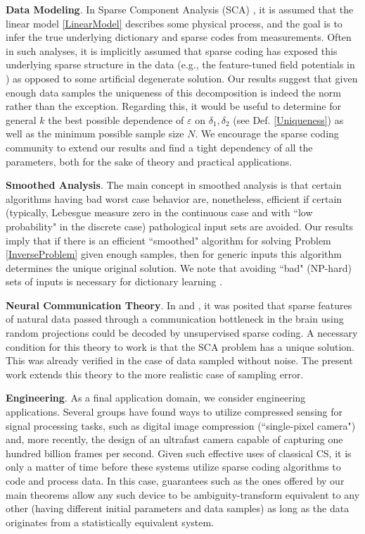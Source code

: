 \documentclass[journal, twocolumn]{IEEEtran}
\begin{document}
\textbf{Data Modeling}.  
In Sparse Component Analysis (SCA) \cite{Georgiev05}, it is assumed that the linear model \eqref{LinearModel} describes some physical process, and the goal is to infer the true underlying dictionary and sparse codes from measurements. Often in such analyses, it is implicitly assumed that sparse coding has exposed this underlying sparse structure in the data (e.g., the feature-tuned field potentials in \cite{Agarwal14}) as opposed to some artificial degenerate solution. Our results suggest that given enough data samples the uniqueness of this decomposition is indeed the norm rather than the exception. Regarding this, it would be useful to determine for general $k$ the best possible dependence of $\varepsilon$ on $\delta_1, \delta_2$ (see Def. \ref{Uniqueness}) as well as the minimum possible sample size $N$. We encourage the sparse coding community to extend our results and find a tight dependency of all the parameters, both for the sake of theory and practical applications.

\textbf{Smoothed Analysis}.
The main concept in smoothed analysis \cite{Spielman04} is that certain algorithms having bad worst case behavior are, nonetheless, efficient if certain (typically, Lebesgue measure zero in the continuous case and with ``low probability" in the discrete case) pathological input sets are avoided. Our results imply that if there is an efficient ``smoothed" algorithm for solving Problem \ref{InverseProblem} given enough samples, then for generic inputs this algorithm determines the unique original solution. We note that avoiding ``bad" (NP-hard) sets of inputs is necessary for dictionary learning \cite{Razaviyayn15, Tillmann15}.

\textbf{Neural Communication Theory}.
In \cite{Coulter10} and \cite{Isely10}, it was posited that sparse features of natural data passed through a communication bottleneck in the brain using random projections could be decoded by unsupervised sparse coding.  A necessary condition for this theory to work is that the SCA problem has a unique solution.  This was already verified in the case of data sampled without noise.  The present work extends this theory to the more realistic case of sampling error.

\textbf{Engineering}.
As a final application domain, we consider engineering applications.  Several groups have found ways to utilize compressed sensing for signal processing tasks, such as digital image compression \cite{Duarte08} (``single-pixel camera") and, more recently, the design of an ultrafast camera \cite{Gao14} capable of capturing one hundred billion frames per second. Given such effective uses of classical CS, it is only a matter of time before these systems utilize sparse coding algorithms to code and process data. In this case, guarantees such as the ones offered by our main theorems allow any such device to be ambiguity-transform equivalent to any other (having different initial parameters and data samples) as long as the data originates from a statistically equivalent system.
\end{document}
